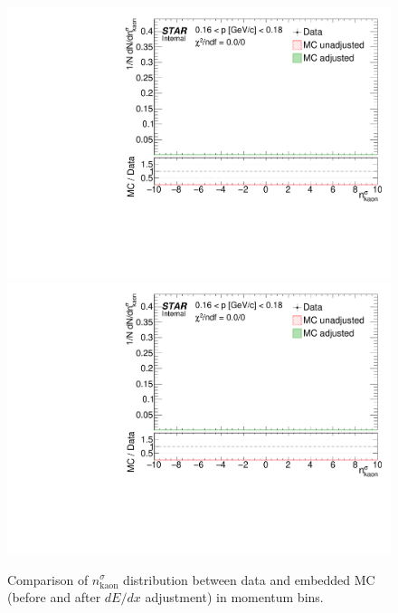 \begin{figure}[ht]
\centering%
\caption[Comparison of $n^{\sigma}_{\text{kaon}}$ distribution between data and embedded MC in momentum bins.]{Comparison of $n^{\sigma}_{\text{kaon}}$ distribution between data and embedded MC (before and after $dE/dx$ adjustment) in momentum bins.}\label{fig:dEdxDataVsMC}
\parbox{0.495\textwidth}{
  \centering
  \includegraphics[width=\linewidth,page=8]{graphics/dedx/nSigmaKaon_DataVsMC.pdf}\\[3pt]
  \includegraphics[width=\linewidth,page=10]{graphics/dedx/nSigmaKaon_DataVsMC.pdf}\\[3pt]
}
\end{figure}
